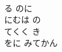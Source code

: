 \documentclass[10pt,b5j]{tarticle} %
\begin{document}
\begin{enumerate}
\begin{minipage}[c]{\blocksize}
    \end{minipage}
    \begin{minipage}[c]{\blocksize}
        
        \vspace{\linespace}
        \item~\\
        る のに\\
        にむは の\\
        てくく き\\
        をに みてかん
    
    \end{minipage}
\end{enumerate} %
\end{document}
